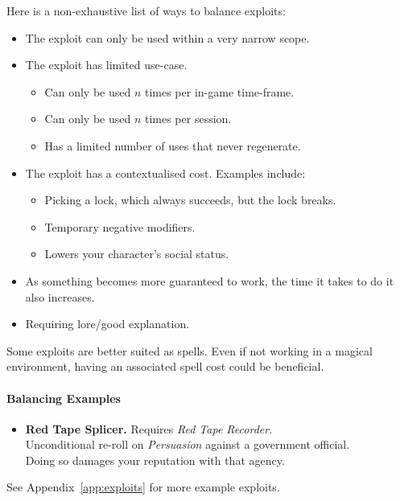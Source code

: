 Here is a non-exhaustive list of ways to balance exploits:
\begin{itemize}
    \item The exploit can only be used within a very narrow scope.
    \item The exploit has limited use-case.
    \begin{itemize}
        \item Can only be used $n$ times per in-game time-frame.
        \item Can only be used $n$ times per session.
        \item Has a limited number of uses that never regenerate.
    \end{itemize}
    \item The exploit has a contextualised cost. Examples include:
    \begin{itemize}
        \item Picking a lock, which always succeeds, but the lock breaks.
        \item Temporary negative modifiers.
        \item Lowers your character's social status.
    \end{itemize}
    \item As something becomes more guaranteed to work, the time it takes to do it also increases.
    \item Requiring lore/good explanation.
\end{itemize}

Some exploits are better suited as spells. 
Even if not working in a magical environment, having an associated spell cost could be beneficial.

\paragraph{Balancing Examples}
\begin{itemize}
    \item \textbf{Red Tape Splicer.} Requires \textit{Red Tape Recorder}.\\
    Unconditional re-roll on \textit{Persuasion} against a government official.\\
    Doing so damages your reputation with that agency.
\end{itemize}
See Appendix~\ref{app:exploits} for more example exploits.